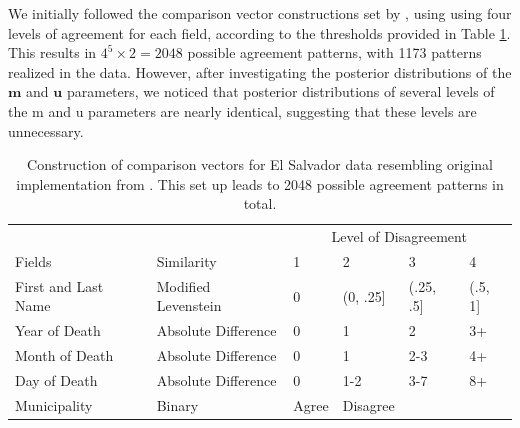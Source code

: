 \documentclass[ba]{imsart}
\begin{document}
	We initially followed the comparison vector constructions set by \cite{sadinle_bayesian_2017}, using using four levels of agreement for each field, according to the thresholds provided in Table \ref{Tab:el_salvador_cutoffs_1}. This results in \(4^5 \times 2 = 2048\) possible agreement patterns, with 1173 patterns realized in the data. However, after investigating the posterior distributions of the $\bm{m}$ and $\bm{u}$ parameters, we noticed that posterior distributions of several levels of the m and u parameters are nearly identical, suggesting that these levels are unnecessary.
	
	
	
	
	\begin{table}
		\begin{tabular}[t]{llllll}
			\multicolumn{2}{c}{ } & \multicolumn{4}{c}{Level of Disagreement} \\
			\cline{3-6}
			Fields & Similarity & 1 & 2 & 3 & 4\\
			\hline
			First and Last Name & Modified Levenstein & 0 & (0, .25] & (.25, .5] & (.5, 1]\\
			Year of Death & Absolute Difference & 0 & 1 & 2 & 3+\\
			Month of Death & Absolute Difference & 0 & 1 & 2-3 & 4+\\
			Day of Death & Absolute Difference & 0 & 1-2 & 3-7 & 8+\\
			Municipality & Binary & Agree & Disagree &  & \\
			\hline
		\end{tabular}
		\caption{Construction of comparison vectors for El Salvador data resembling original implementation from \citep{sadinle2018bayesian}. This set up leads to 2048 possible agreement patterns in total.}\label{Tab:el_salvador_cutoffs_1}
	\end{table}
	
\end{document}
